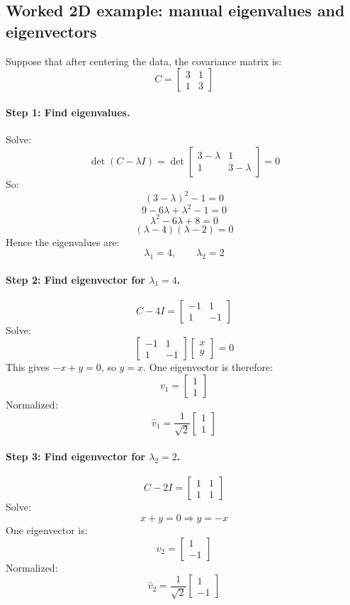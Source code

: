 \documentclass[11pt]{article}
\begin{document}
\subsection{Worked 2D example: manual eigenvalues and eigenvectors}
Suppose that after centering the data, the covariance matrix is:
\[
  C =
  \begin{bmatrix}
    3 & 1\\
    1 & 3
  \end{bmatrix}
\]

\paragraph{Step 1: Find eigenvalues.}
Solve:
\[
  \det(C-\lambda I)=
  \det
  \begin{bmatrix}
    3-\lambda & 1\\
    1 & 3-\lambda
  \end{bmatrix}
  = 0
\]
So:
\[
  (3-\lambda)^2 - 1 = 0
\]
\[
  9 - 6\lambda + \lambda^2 - 1 = 0
\]
\[
  \lambda^2 - 6\lambda + 8 = 0
\]
\[
  (\lambda - 4)(\lambda - 2)=0
\]
Hence the eigenvalues are:
\[
  \lambda_1 = 4,\qquad \lambda_2 = 2
\]

\paragraph{Step 2: Find eigenvector for $\lambda_1 = 4$.}
\[
  C - 4I =
  \begin{bmatrix}
    -1 & 1\\
    1 & -1
  \end{bmatrix}
\]
Solve:
\[
  \begin{bmatrix}
    -1 & 1\\
    1 & -1
  \end{bmatrix}
  \begin{bmatrix}
    x\\y
  \end{bmatrix}
  = 0
\]
This gives $-x + y = 0$, so $y=x$.
One eigenvector is therefore:
\[
  v_1 =
  \begin{bmatrix}
    1\\1
  \end{bmatrix}
\]
Normalized:
\[
  \hat v_1 = \frac{1}{\sqrt{2}}
  \begin{bmatrix}
    1\\1
  \end{bmatrix}
\]

\paragraph{Step 3: Find eigenvector for $\lambda_2 = 2$.}
\[
  C - 2I =
  \begin{bmatrix}
    1 & 1\\
    1 & 1
  \end{bmatrix}
\]
Solve:
\[
  x + y = 0 \Rightarrow y = -x
\]
One eigenvector is:
\[
  v_2 =
  \begin{bmatrix}
    1\\-1
  \end{bmatrix}
\]
Normalized:
\[
  \hat v_2 = \frac{1}{\sqrt{2}}
  \begin{bmatrix}
    1\\-1
  \end{bmatrix}
\]
\end{document}
